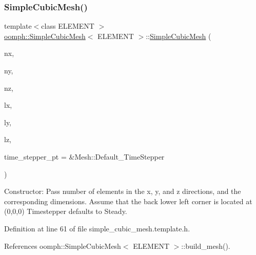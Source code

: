 \subsubsection{\texorpdfstring{Simple\+Cubic\+Mesh()}{SimpleCubicMesh()}\hspace{0.1cm}{\footnotesize\ttfamily [1/2]}}
{\footnotesize\ttfamily template$<$class E\+L\+E\+M\+E\+NT $>$ \\
\hyperlink{classoomph_1_1SimpleCubicMesh}{oomph\+::\+Simple\+Cubic\+Mesh}$<$ E\+L\+E\+M\+E\+NT $>$\+::\hyperlink{classoomph_1_1SimpleCubicMesh}{Simple\+Cubic\+Mesh} (\begin{DoxyParamCaption}\item[{const unsigned \&}]{nx,  }\item[{const unsigned \&}]{ny,  }\item[{const unsigned \&}]{nz,  }\item[{const double \&}]{lx,  }\item[{const double \&}]{ly,  }\item[{const double \&}]{lz,  }\item[{Time\+Stepper $\ast$}]{time\+\_\+stepper\+\_\+pt = {\ttfamily \&Mesh\+:\+:Default\+\_\+TimeStepper} }\end{DoxyParamCaption})\hspace{0.3cm}{\ttfamily [inline]}}



Constructor\+: Pass number of elements in the x, y, and z directions, and the corresponding dimensions. Assume that the back lower left corner is located at (0,0,0) Timestepper defaults to Steady. 



Definition at line 61 of file simple\+\_\+cubic\+\_\+mesh.\+template.\+h.



References oomph\+::\+Simple\+Cubic\+Mesh$<$ E\+L\+E\+M\+E\+N\+T $>$\+::build\+\_\+mesh().

\mbox{\label{classoomph_1_1SimpleCubicMesh_a22d32a0d85ab3ec9ac3e52cad0bb81d7}} 
